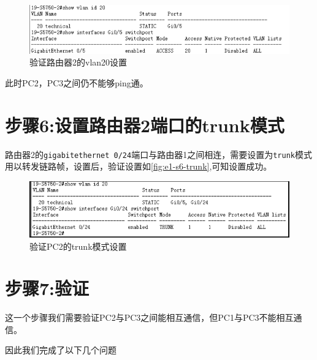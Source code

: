 \documentclass{myreport}
\begin{document}
\begin{figure}[htp]
    \centering
    \includegraphics[width=13cm]{"./figure/2018-05-04-10-12-46.png"}
    \caption{验证路由器2的vlan20设置}
    \label{fig:e1-s5-vlan20}
\end{figure}

此时PC2，PC3之间仍不能够ping通。

\section{步骤6:设置路由器2端口的trunk模式}

路由器2的\texttt{gigabitethernet 0/24}端口与路由器1之间相连，需要设置为\texttt{trunk}模式用以转发链路帧，设置后，验证设置如\autoref{fig:e1-s6-trunk},可知设置成功。

\begin{figure}[htp]
    \centering
    \includegraphics[width=13cm]{"./figure/2018-05-04-10-13-08.png"}
    \caption{验证PC2的trunk模式设置}
    \label{fig:e1-s6-trunk}
\end{figure}

\section{步骤7:验证}

这一个步骤我们需要验证PC2与PC3之间能相互通信，但PC1与PC3不能相互通信。

因此我们完成了以下几个问题
\end{document}
